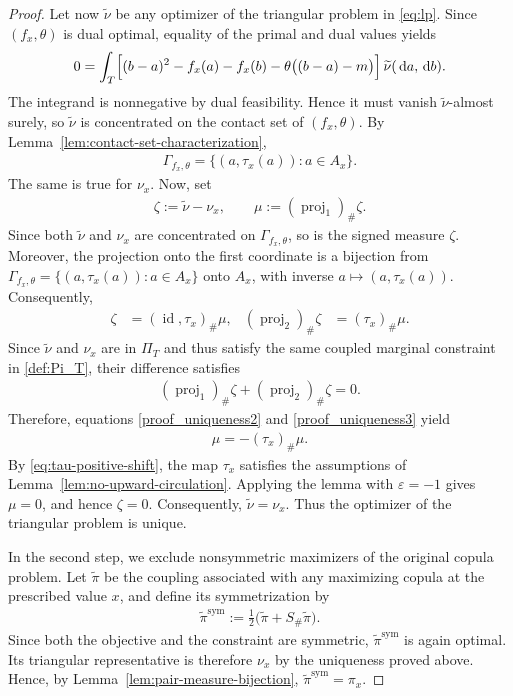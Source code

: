 \documentclass{article}
\newcommand{\de}{\mathrm{\,d}}
\begin{document}
\begin{proof}
Let now \(\widetilde\nu\) be any optimizer of the triangular problem in \eqref{eq:lp}.
Since \((f_x,\theta)\) is dual optimal, equality of the primal and dual values yields
\begin{align*}
    0
    =
    \int_T
    \Bigl[
        (b-a)^2
        -f_x(a)-f_x(b)
        -\theta\bigl((b-a)-m\bigr)
    \Bigr]
    \,\widetilde\nu(\de a,\de b).
\end{align*}
The integrand is nonnegative by dual feasibility.
Hence it must vanish \(\widetilde\nu\)-almost surely, so \(\widetilde\nu\) is concentrated on the contact set of \((f_x,\theta)\).
By Lemma~\ref{lem:contact-set-characterization},
\begin{align*}
    \Gamma_{f_x,\theta}
    =
    \{(a,\tau_x(a)):a\in A_x\}.
\end{align*}
The same is true for \(\nu_x\).
Now, set
\begin{align*}
    \zeta:=\widetilde\nu-\nu_x,
    \qquad
    \mu:=(\operatorname{proj}_1)_\#\zeta.
\end{align*}
Since both \(\widetilde\nu\) and \(\nu_x\) are concentrated on \(\Gamma_{f_x,\theta}\), so is the signed measure \(\zeta\).
Moreover, the projection onto the first coordinate is a bijection from \(\Gamma_{f_x,\theta} = \{(a,\tau_x(a)):a\in A_x\} \) onto \(A_x\), with inverse \(a\mapsto(a,\tau_x(a))\).
Consequently,
\begin{align}\label{proof_uniqueness2}
    \zeta
    &=
    (\operatorname{id},\tau_x)_\#\mu,
    &
    (\operatorname{proj}_2)_\#\zeta
    &=
    (\tau_x)_\#\mu.
\end{align}
Since \(\widetilde\nu\) and \(\nu_x\) are in \(\Pi_T\) and thus satisfy the same coupled marginal constraint in \eqref{def:Pi_T}, their difference satisfies
\begin{align}\label{proof_uniqueness3}
    (\operatorname{proj}_1)_\#\zeta
    +
    (\operatorname{proj}_2)_\#\zeta
    =0.
\end{align}
Therefore, equations \eqref{proof_uniqueness2} and \eqref{proof_uniqueness3} yield
\begin{align*}
    \mu=-(\tau_x)_\#\mu.
\end{align*}
By \eqref{eq:tau-positive-shift}, the map \(\tau_x\) satisfies the assumptions of Lemma~\ref{lem:no-upward-circulation}.
Applying the lemma with \(\varepsilon=-1\) gives \(\mu=0\), and hence \(\zeta=0\).
Consequently, \(\widetilde\nu=\nu_x.\) Thus the optimizer of the triangular problem is unique.

In the second step, we exclude nonsymmetric maximizers of the original copula problem.
Let \(\widetilde\pi\) be the coupling associated with any maximizing copula at the prescribed value \(x\), and define its symmetrization by
\begin{align*}
    \widetilde\pi^{\operatorname{sym}}
    :=
    \frac12
    \bigl(
        \widetilde\pi+S_\#\widetilde\pi
    \bigr).
\end{align*}
Since both the objective and the constraint are symmetric, \(\widetilde\pi^{\operatorname{sym}}\) is again optimal.
Its triangular representative is therefore \(\nu_x\) by the uniqueness proved above.
Hence, by Lemma~\ref{lem:pair-measure-bijection}, \(\widetilde\pi^{\operatorname{sym}}=\pi_x.\)


\end{proof}
\end{document}
